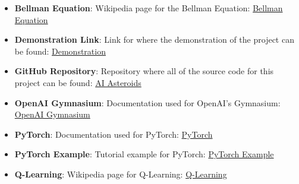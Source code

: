 \documentclass[
	a4paper, %
	10pt, %
	unnumberedsections, %
	twoside, %
]{LTJournalArticle}
\begin{document}
\begin{itemize}
	\item \textbf{Bellman Equation}: Wikipedia page for the Bellman Equation: \href{https://en.wikipedia.org/wiki/Bellman_equation}{Bellman Equation}
	\item \textbf{Demonstration Link}: Link for where the demonstration of the project can be found: \href{https://drive.google.com/file/d/1H2AhFg420gchKzIcZ8_SeoNff2bgeKM_/view?usp=sharing}{Demonstration}
	\item \textbf{GitHub Repository}: Repository where all of the source code for this project can be found: \href{https://github.com/QuantumCompiler/AI-Asteroids}{AI Asteroids}
	\item \textbf{OpenAI Gymnasium}: Documentation used for OpenAI's Gymnasium: \href{https://gymnasium.farama.org/content/basic_usage/}{OpenAI Gymnasium}
	\item \textbf{PyTorch}: Documentation used for PyTorch: \href{https://pytorch.org/docs/stable/index.html}{PyTorch}
	\item \textbf{PyTorch Example}: Tutorial example for PyTorch: \href{https://pytorch.org/tutorials/intermediate/reinforcement_q_learning.html}{PyTorch Example}
	\item \textbf{Q-Learning}: Wikipedia page for Q-Learning: \href{https://en.wikipedia.org/wiki/Q-learning}{Q-Learning}
\end{itemize}
\end{document}
